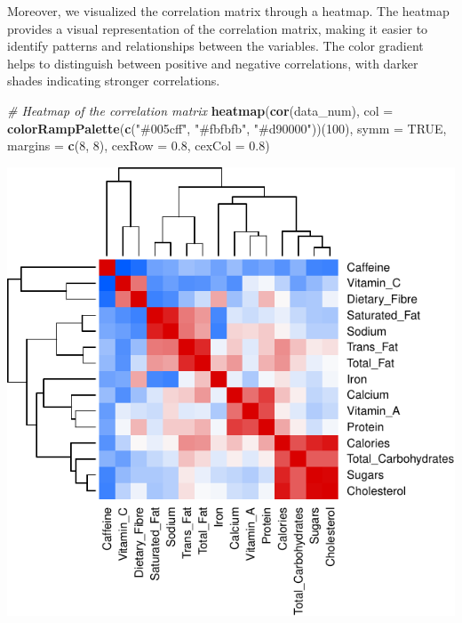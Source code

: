 \documentclass[
]{article}
\newenvironment{Shaded}{\begin{snugshade}}{\end{snugshade}}
\newcommand{\AttributeTok}[1]{\textcolor[rgb]{0.13,0.29,0.53}{#1}}
\newcommand{\CommentTok}[1]{\textcolor[rgb]{0.56,0.35,0.01}{\textit{#1}}}
\newcommand{\ConstantTok}[1]{\textcolor[rgb]{0.56,0.35,0.01}{#1}}
\newcommand{\DecValTok}[1]{\textcolor[rgb]{0.00,0.00,0.81}{#1}}
\newcommand{\FloatTok}[1]{\textcolor[rgb]{0.00,0.00,0.81}{#1}}
\newcommand{\FunctionTok}[1]{\textcolor[rgb]{0.13,0.29,0.53}{\textbf{#1}}}
\newcommand{\NormalTok}[1]{#1}
\newcommand{\StringTok}[1]{\textcolor[rgb]{0.31,0.60,0.02}{#1}}
\begin{document}
Moreover, we visualized the correlation matrix through a heatmap. The
heatmap provides a visual representation of the correlation matrix,
making it easier to identify patterns and relationships between the
variables. The color gradient helps to distinguish between positive and
negative correlations, with darker shades indicating stronger
correlations.

\begin{Shaded}
\begin{Highlighting}[]
\CommentTok{\# Heatmap of the correlation matrix}
\FunctionTok{heatmap}\NormalTok{(}\FunctionTok{cor}\NormalTok{(data\_num), }
        \AttributeTok{col =} \FunctionTok{colorRampPalette}\NormalTok{(}\FunctionTok{c}\NormalTok{(}\StringTok{"\#005cff"}\NormalTok{, }\StringTok{"\#fbfbfb"}\NormalTok{, }\StringTok{"\#d90000"}\NormalTok{))(}\DecValTok{100}\NormalTok{), }
        \AttributeTok{symm =} \ConstantTok{TRUE}\NormalTok{, }\AttributeTok{margins =} \FunctionTok{c}\NormalTok{(}\DecValTok{8}\NormalTok{, }\DecValTok{8}\NormalTok{), }\AttributeTok{cexRow =} \FloatTok{0.8}\NormalTok{, }\AttributeTok{cexCol =} \FloatTok{0.8}\NormalTok{)}
\end{Highlighting}
\end{Shaded}

\begin{center}\includegraphics{Statistical_Learning_Final_Report_files/figure-latex/correlation_analysis_heatmap-1} \end{center}
\end{document}
